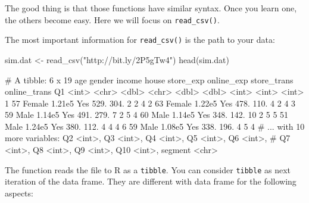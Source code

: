 \documentclass[
  12pt,
]{krantz}
\makeatletter
\newenvironment{Shaded}{\begin{snugshade}}{\end{snugshade}}
\newcommand{\FunctionTok}[1]{\textcolor[rgb]{0,0,0}{#1}}
\newcommand{\NormalTok}[1]{#1}
\newcommand{\OtherTok}[1]{\textcolor[rgb]{0.37,0.37,0.37}{#1}}
\newcommand{\StringTok}[1]{\textcolor[rgb]{0.5,0.5,0.5}{#1}}
\newenvironment{kframe}{%
\medskip{}
\setlength{\fboxsep}{.8em}
 \def\at@end@of@kframe{}%
 \ifinner\ifhmode%
  \def\at@end@of@kframe{\end{minipage}}%
  \begin{minipage}{\columnwidth}%
 \fi\fi%
 \def\FrameCommand##1{\hskip\@totalleftmargin \hskip-\fboxsep
 \colorbox{shadecolor}{##1}\hskip-\fboxsep
     \hskip-\linewidth \hskip-\@totalleftmargin \hskip\columnwidth}%
 \MakeFramed {\advance\hsize-\width
   \@totalleftmargin\z@ \linewidth\hsize
   \@setminipage}}%
 {\par\unskip\endMakeFramed%
 \at@end@of@kframe}
\renewenvironment{Shaded}{\begin{kframe}}{\end{kframe}}
\makeatother
\begin{document}
The good thing is that those functions have similar syntax. Once you learn one, the others become easy. Here we will focus on \texttt{read\_csv()}.

The most important information for \texttt{read\_csv()} is the path to your data:

\begin{Shaded}
\begin{Highlighting}[]
\NormalTok{sim.dat }\OtherTok{\textless{}{-}} \FunctionTok{read\_csv}\NormalTok{(}\StringTok{"http://bit.ly/2P5gTw4"}\NormalTok{)}
\FunctionTok{head}\NormalTok{(sim.dat)}
\end{Highlighting}
\end{Shaded}

\begin{Shaded}
\begin{Highlighting}[]
\NormalTok{\# A tibble: 6 x 19}
\NormalTok{    age gender income house store\_exp online\_exp store\_trans online\_trans    Q1}
\NormalTok{  \textless{}int\textgreater{} \textless{}chr\textgreater{}   \textless{}dbl\textgreater{} \textless{}chr\textgreater{}     \textless{}dbl\textgreater{}      \textless{}dbl\textgreater{}       \textless{}int\textgreater{}        \textless{}int\textgreater{} \textless{}int\textgreater{}}
\NormalTok{1    57 Female 1.21e5 Yes        529.       304.           2            2     4}
\NormalTok{2    63 Female 1.22e5 Yes        478.       110.           4            2     4}
\NormalTok{3    59 Male   1.14e5 Yes        491.       279.           7            2     5}
\NormalTok{4    60 Male   1.14e5 Yes        348.       142.          10            2     5}
\NormalTok{5    51 Male   1.24e5 Yes        380.       112.           4            4     4}
\NormalTok{6    59 Male   1.08e5 Yes        338.       196.           4            5     4}
\NormalTok{\# ... with 10 more variables: Q2 \textless{}int\textgreater{}, Q3 \textless{}int\textgreater{}, Q4 \textless{}int\textgreater{}, Q5 \textless{}int\textgreater{}, Q6 \textless{}int\textgreater{},}
\NormalTok{\#   Q7 \textless{}int\textgreater{}, Q8 \textless{}int\textgreater{}, Q9 \textless{}int\textgreater{}, Q10 \textless{}int\textgreater{}, segment \textless{}chr\textgreater{}}
\end{Highlighting}
\end{Shaded}

The function reads the file to R as a \texttt{tibble}. You can consider \texttt{tibble} as next iteration of the data frame. They are different with data frame for the following aspects:
\end{document}
